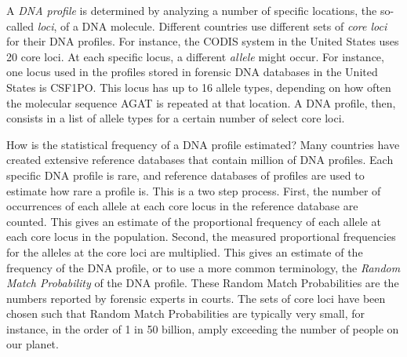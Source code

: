 \documentclass[10pt]{article}
\begin{document}
A \textit{DNA profile} is determined by analyzing a number of specific locations, the so-called \textit{loci}, of a DNA molecule. %
Different countries use different sets of %
\textit{core loci} for their DNA profiles. 
For instance, the CODIS system in the United States uses %
20 core loci. 
At each specific locus, a different \textit{allele} might occur. 
For instance, one locus used in the profiles stored in forensic DNA databases in the United States is CSF1PO. 
This locus has up to 16 allele types, depending on how often the molecular sequence AGAT is repeated at that location. 
A DNA profile, then, consists in a list of allele types for a certain number of select core loci. 


How is the statistical frequency of a DNA profile estimated?
Many countries have created extensive reference databases that contain million of DNA profiles. 
Each specific DNA profile is rare, and reference databases of profiles 
are used to estimate 
how rare a profile 
is.
This is a two step process. First, the number of occurrences of each allele at each core locus in the reference database are counted.
This gives an estimate of the proportional frequency of each allele at each core locus in the population. Second, the measured proportional frequencies for the alleles at the core loci are 
multiplied. This gives an estimate of the frequency of the DNA profile, or to use a more common terminology, 
the \textit{Random Match Probability} of the DNA profile. %
These Random Match Probabilities are the numbers reported by forensic experts in courts. %
The sets of core loci have been chosen such that Random Match Probabilities are typically very small, for instance, in the order of 1 in 50 billion, amply exceeding the number of people on our planet. 
\end{document}
